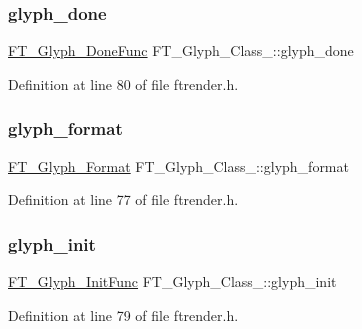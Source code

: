 \subsubsection{\texorpdfstring{glyph\_done}{glyph\_done}}
{\footnotesize\ttfamily \mbox{\hyperlink{ftrender_8h_a1e2936ce7a25061111dc3bfbeef20026}{F\+T\+\_\+\+Glyph\+\_\+\+Done\+Func}} F\+T\+\_\+\+Glyph\+\_\+\+Class\+\_\+\+::glyph\+\_\+done}



Definition at line 80 of file ftrender.\+h.

\mbox{\label{struct_f_t___glyph___class___a26738bd14d5845e18d09ccaa3a709d23}} 
\subsubsection{\texorpdfstring{glyph\_format}{glyph\_format}}
{\footnotesize\ttfamily \mbox{\hyperlink{ftimage_8h_aeca0d10a27aedecbf96515e0628aff1f}{F\+T\+\_\+\+Glyph\+\_\+\+Format}} F\+T\+\_\+\+Glyph\+\_\+\+Class\+\_\+\+::glyph\+\_\+format}



Definition at line 77 of file ftrender.\+h.

\mbox{\label{struct_f_t___glyph___class___a657200ad15ff061b38fb25b168737f95}} 
\subsubsection{\texorpdfstring{glyph\_init}{glyph\_init}}
{\footnotesize\ttfamily \mbox{\hyperlink{ftrender_8h_a55b3628735bbb8ac0d485aec0f6ff737}{F\+T\+\_\+\+Glyph\+\_\+\+Init\+Func}} F\+T\+\_\+\+Glyph\+\_\+\+Class\+\_\+\+::glyph\+\_\+init}



Definition at line 79 of file ftrender.\+h.

\mbox{\label{struct_f_t___glyph___class___af7f406e5ea20a6614c946746938830c9}} 
